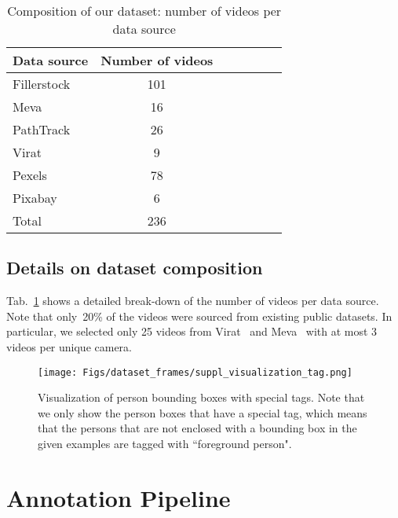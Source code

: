 \documentclass[runningheads]{llncs}
\begin{document}
\begin{table}[t]
    \centering
    \small
    \begin{tabular}{lcccccc}
        \toprule
        Data source & Number of videos  \\
        \midrule
        Fillerstock~\cite{fillerstock} & 101 \\
        Meva~\cite{meva} &	16 \\
        PathTrack~\cite{pathtrack}	& 26 \\
        Virat~\cite{virat}	& 9 \\
        Pexels~\cite{pexels}	& 78 \\
        Pixabay~\cite{pixabay}	& 6 \\
        \midrule
        Total & 236\\
        \bottomrule
    \end{tabular}
    
    \caption{Composition of our dataset: number of videos per data source}
    \label{tab:data_pools}
\end{table}

\subsection{Details on dataset composition}
Tab.~\ref{tab:data_pools} shows a detailed break-down of the number of videos per data source. Note that only~20\% of the videos were sourced from existing public datasets. In particular, we selected only 25 videos from Virat~\cite{virat} and Meva~\cite{meva} with at most 3 videos per unique camera.

\begin{figure}[t]
    \centering
    \texttt{[image: Figs/dataset\_frames/suppl\_visualization\_tag.png]}
    \caption{Visualization of person bounding boxes with special tags. Note that we only show the person boxes that have a special tag, which means that the persons that are not enclosed with a bounding box in the given examples are tagged with ``foreground person". }
    \label{fig:suppl_vis_tag}
\end{figure}

\section{Annotation Pipeline}
\end{document}
